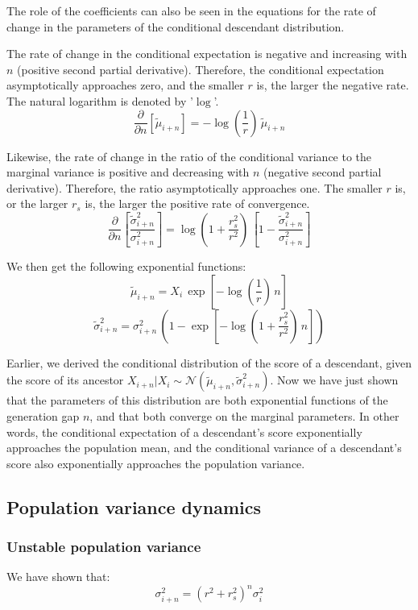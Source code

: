 \documentclass[a4paper,11pt]{article} %
\begin{document}
The role of the coefficients can also be seen in the equations for the rate of change in the parameters of the conditional descendant distribution.

The rate of change in the conditional expectation is negative and increasing with $n$ (positive second partial derivative). Therefore, the conditional expectation asymptotically approaches zero, and the smaller $r$ is, the larger the negative rate. The natural logarithm is denoted by '$\log$'.
$$\frac{\partial }{\partial n}[\tilde{\mu}_{i+n}] = -\log(\frac{1}{r}) \, \tilde{\mu}_{i+n}$$


Likewise, the rate of change in the ratio of the conditional variance to the marginal variance is positive and decreasing with $n$ (negative second partial derivative). Therefore, the ratio asymptotically approaches one. The smaller $r$ is, or the larger $r_s$ is, the larger the positive rate of convergence.
$$\frac{\partial }{\partial n}[\frac{\tilde{\sigma}_{i+n}^2}{\sigma_{i+n}^2}] = \log(1+\frac{r_s^2}{r^2}) \, [1 - \frac{\tilde{\sigma}_{i+n}^2}{\sigma_{i+n}^2}]$$

We then get the following exponential functions:
$$\tilde{\mu}_{i+n} = X_i \, \exp[-\log(\frac{1}{r}) \, n]$$
$$\tilde{\sigma}_{i+n}^2 = \sigma_{i+n}^2 \, (1 - \exp[-\log(1+\frac{r_s^2}{r^2}) \, n])$$

Earlier, we derived the conditional distribution of the score of a descendant, given the score of its ancestor $X_{i+n}|X_i \sim \mathcal{N}( \tilde{\mu}_{i+n}, \tilde{\sigma}_{i+n}^2)$. Now we have just shown that the parameters of this distribution are both exponential functions of the generation gap $n$, and that both converge on the marginal parameters. In other words, the conditional expectation of a descendant's score exponentially approaches the population mean, and the conditional variance of a descendant's score also exponentially approaches the population variance. 




\subsection{Population variance dynamics}

\subsubsection*{Unstable population variance}
We have shown that:
$$\sigma_{i+n}^2 = (r^2+r_s^2)^n  \sigma_{i}^2$$
\end{document}
